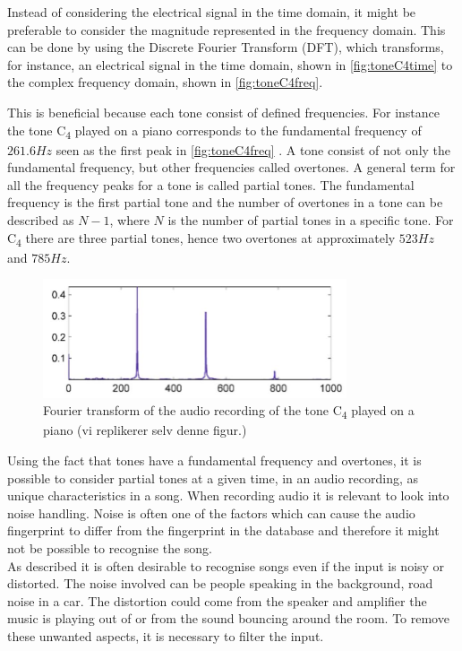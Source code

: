 Instead of considering the electrical signal in the time domain, it might be preferable to consider the magnitude represented in the frequency domain. This can be done by using the Discrete Fourier Transform (DFT), which transforms, for instance, an electrical signal in the time domain, shown in \autoref{fig:toneC4time} to the complex frequency domain, shown in \autoref{fig:toneC4freq}.

This is beneficial because each tone consist of defined frequencies. For instance the tone C\textsubscript{4} played on a piano corresponds to the fundamental frequency of $261.6 \si{Hz}$ seen as the first peak in \autoref{fig:toneC4freq} \cite[29]{Meinard2015Fundamentals}. A tone consist of not only the fundamental frequency, but other frequencies called overtones. A general term for all the frequency peaks for a tone is called partial tones. The fundamental frequency is the first partial tone and the number of overtones in a tone can be described as $N-1$, where $N$ is the number of partial tones in a specific tone. For C\textsubscript{4} there are three partial tones, hence two overtones at approximately $523 \si{Hz}$ and $ 785 \si{Hz}$. \cite[41]{Meinard2015Fundamentals}
\begin{figure}[H]
    \centering
    \includegraphics[width=0.8\textwidth]{figures/toneC4freq.JPG}
    \caption{Fourier transform of the audio recording of the tone C\textsubscript{4} played on a piano (vi replikerer selv denne figur.)}
    \label{fig:toneC4freq}
\end{figure}
Using the fact that tones have a fundamental frequency and overtones, it is possible to consider partial tones at a given time, in an audio recording, as unique characteristics in a song. When recording audio it is relevant to look into noise handling. Noise is often one of the factors which can cause the audio fingerprint to differ from the fingerprint in the database and therefore it might not be possible to recognise the song.\\
As described it is often desirable to recognise songs even if the input is noisy or distorted. The noise involved can be people speaking in the background, road noise in a car. The distortion could come from the speaker and amplifier the music is playing out of or from the sound bouncing around the room. To remove these unwanted aspects, it is necessary to filter the input.\cite{haitsma2003highly}\\


